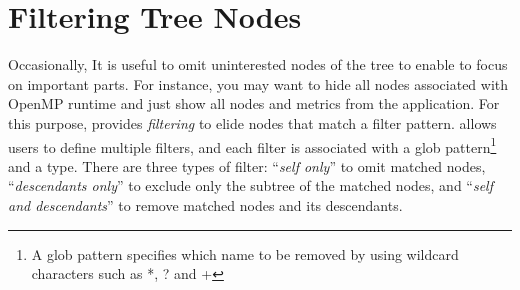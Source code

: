 \section{Filtering Tree Nodes}
\label{sec:filter}
Occasionally, It is useful to omit uninterested nodes of the tree to enable to focus on important parts.
For instance, you may want to hide all nodes associated with OpenMP runtime and just show all nodes and metrics from the application.
For this purpose, \hpcviewer{} provides \emph{filtering} to elide nodes that match a filter pattern.
\hpcviewer{} allows  users to define multiple filters, and each filter is associated with a glob pattern\footnote{A glob pattern specifies which name to be removed by using wildcard characters such as *, ? and +} and a type.
There are three types of filter: ``\emph{self only}'' to omit matched nodes,
``\emph{descendants only}'' to exclude only the subtree of the matched nodes, and ``\emph{self and descendants}'' to
remove matched nodes and its descendants.

